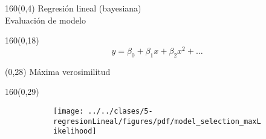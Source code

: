 \documentclass[shownotes,aspectratio=169]{beamer}
\begin{document}
\begin{frame}[plain]
\begin{textblock}{160}(0,4)
\centering  \Large Regresi\'on lineal (bayesiana) \\
\large Evaluación de modelo
\end{textblock}



\begin{textblock}{160}(0,18)
\begin{equation*}
y = \beta_0 + \beta_1 x + \beta_2 x^2 + \dots
\end{equation*}
\end{textblock}

\begin{textblock}{80}(0,28)
 \centering
 M\'axima verosimilitud
\end{textblock}


\begin{textblock}{160}(0,29)
     \centering
  \begin{figure}[H]
     \centering
      \begin{subfigure}[b]{0.45\textwidth}
       \texttt{[image: ../../clases/5-regresionLineal/figures/pdf/model\_selection\_maxLikelihood]}
     \end{subfigure}
\end{figure}
\end{textblock}

\end{frame}
\end{document}
